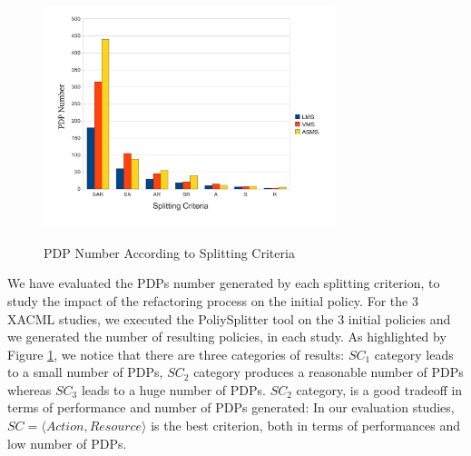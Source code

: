 \begin{figure}[!h]
  \centering
\includegraphics[width=8.5cm, height=7.2cm]{pdpnumber.pdf}
\begin{center}
\caption{PDP Number According to Splitting Criteria}
\label{pdpnumber}
\end{center}
\end{figure} 

We have evaluated the PDPs number generated by each splitting criterion, to study the impact of the refactoring process on the initial policy. 
For the 3 XACML studies, we executed the PoliySplitter tool on the 3 initial policies and we generated the number of resulting policies, in each study. 
As highlighted by Figure \ref{pdpnumber}, we notice that there are three
 categories of results: $SC_{1}$ category leads to a small number of PDPs, $SC_{2}$ category produces a reasonable number of PDPs whereas $SC_{3}$ leads to a huge 
number of PDPs. $SC_{2}$ category, is a good tradeoff in terms of performance and number of 
PDPs generated: In our evaluation studies, $SC=\langle Action, Resource\rangle$ is the best criterion, both in terms of performances and low number of PDPs.


